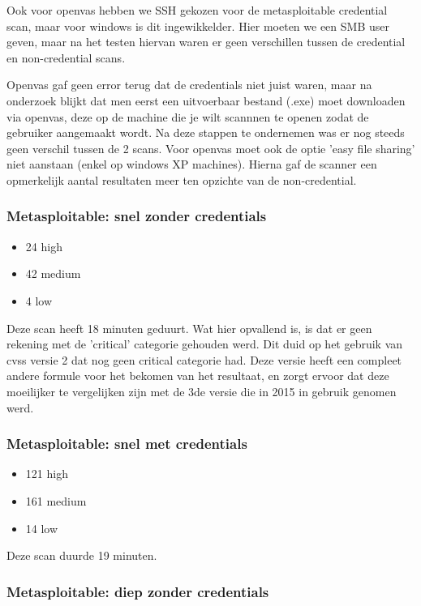 Ook voor openvas hebben we SSH gekozen voor de metasploitable credential scan, maar voor windows is dit ingewikkelder. Hier moeten we een SMB user geven, maar na het testen hiervan waren er geen verschillen tussen de credential en non-credential scans. 

Openvas gaf geen error terug dat de credentials niet juist waren, maar na onderzoek blijkt dat men eerst een uitvoerbaar bestand (.exe) moet downloaden via openvas, deze op de machine die je wilt scannnen te openen zodat de gebruiker aangemaakt wordt. Na deze stappen te ondernemen was er nog steeds geen verschil tussen de 2 scans. Voor openvas moet ook de optie 'easy file sharing' niet aanstaan (enkel op windows XP machines). Hierna gaf de scanner een opmerkelijk aantal resultaten meer ten opzichte van de non-credential.

\subsubsection{Metasploitable: snel zonder credentials}

\begin{itemize}
\item 24 high
\item 42 medium
\item 4 low
\end{itemize}

Deze scan heeft 18 minuten geduurt. Wat hier opvallend is, is dat er geen rekening met de 'critical' categorie gehouden werd. Dit duid op het gebruik van cvss versie 2 dat nog geen critical categorie had. Deze versie heeft een compleet andere formule voor het bekomen van het resultaat, en zorgt ervoor dat deze moeilijker te vergelijken zijn met de 3de versie die in 2015 in gebruik genomen werd.

\subsubsection{Metasploitable: snel met credentials}

\begin{itemize}
\item 121 high
\item 161 medium
\item 14 low
\end{itemize}

Deze scan duurde 19 minuten.

\subsubsection{Metasploitable: diep zonder credentials}

